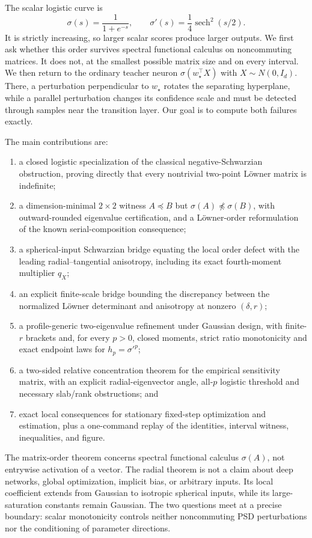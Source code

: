 \documentclass[11pt]{article}
\newcommand{\sech}{\operatorname{sech}}
\begin{document}
The scalar logistic curve is
\[
 \sigma(s)=\frac1{1+e^{-s}},\qquad
 \sigma'(s)=\frac1{4}\sech^2(s/2).
\]
It is strictly increasing, so larger scalar scores produce larger outputs.  We first ask whether this order survives
spectral functional calculus on noncommuting matrices.  It does not, at the smallest possible matrix size and on
every interval.  We then return to the ordinary teacher neuron $\sigma(w_\star^\top X)$ with
$X\sim N(0,I_d)$.  There, a perturbation perpendicular to $w_\star$ rotates the separating hyperplane, while a
parallel perturbation changes its confidence scale and must be detected through samples near the transition layer.
Our goal is to compute both failures exactly.

The main contributions are:
\begin{enumerate}[leftmargin=2em]
 \item a closed logistic specialization of the classical negative-Schwarzian obstruction, proving directly that
 every nontrivial two-point L\"owner matrix is indefinite;
 \item a dimension-minimal $2\times2$ witness $A\preceq B$ but $\sigma(A)\npreceq\sigma(B)$, with
 outward-rounded eigenvalue certification, and a L\"owner-order reformulation of the known serial-composition
 consequence;
 \item a spherical-input Schwarzian bridge equating the local order defect with the leading
 radial--tangential anisotropy, including its exact fourth-moment multiplier $q_X$;
 \item an explicit finite-scale bridge bounding the discrepancy between the normalized L\"owner determinant
 and anisotropy at nonzero $(\delta,r)$;
 \item a profile-generic two-eigenvalue refinement under Gaussian design, with finite-$r$ brackets and, for
 every $p>0$, closed moments, strict ratio monotonicity and exact endpoint laws for $h_p=\sigma'^p$;
 \item a two-sided relative concentration theorem for the empirical sensitivity matrix, with an explicit
 radial-eigenvector angle, all-$p$ logistic threshold and necessary slab/rank obstructions; and
 \item exact local consequences for stationary fixed-step optimization and estimation, plus a one-command replay
 of the identities,
 interval witness, inequalities, and figure.
\end{enumerate}

The matrix-order theorem concerns spectral functional calculus $\sigma(A)$, not entrywise activation of a vector.
The radial theorem is not a claim about deep networks, global optimization, implicit bias, or arbitrary inputs.  Its
local coefficient extends from Gaussian to isotropic spherical inputs, while its large-saturation constants remain
Gaussian.  The
two questions meet at a precise boundary: scalar monotonicity controls neither noncommuting PSD perturbations nor
the conditioning of parameter directions.
\end{document}
